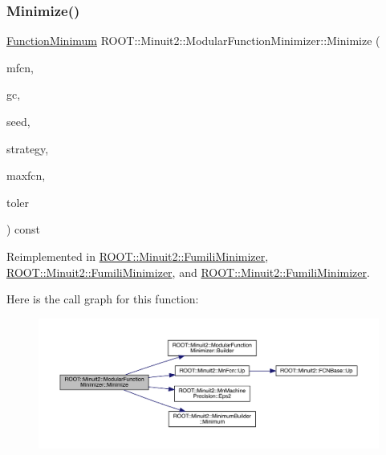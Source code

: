 \subsubsection{\texorpdfstring{Minimize()}{Minimize()}\hspace{0.1cm}{\footnotesize\ttfamily [31/33]}}
{\footnotesize\ttfamily \mbox{\hyperlink{classROOT_1_1Minuit2_1_1FunctionMinimum}{Function\+Minimum}} R\+O\+O\+T\+::\+Minuit2\+::\+Modular\+Function\+Minimizer\+::\+Minimize (\begin{DoxyParamCaption}\item[{const \mbox{\hyperlink{classROOT_1_1Minuit2_1_1MnFcn}{Mn\+Fcn}} \&}]{mfcn,  }\item[{const \mbox{\hyperlink{classROOT_1_1Minuit2_1_1GradientCalculator}{Gradient\+Calculator}} \&}]{gc,  }\item[{const \mbox{\hyperlink{classROOT_1_1Minuit2_1_1MinimumSeed}{Minimum\+Seed}} \&}]{seed,  }\item[{const \mbox{\hyperlink{classROOT_1_1Minuit2_1_1MnStrategy}{Mn\+Strategy}} \&}]{strategy,  }\item[{unsigned int}]{maxfcn,  }\item[{double}]{toler }\end{DoxyParamCaption}) const\hspace{0.3cm}{\ttfamily [virtual]}}



Reimplemented in \mbox{\hyperlink{classROOT_1_1Minuit2_1_1FumiliMinimizer_ace396e586a17ad934f18b32c8ddd054a}{R\+O\+O\+T\+::\+Minuit2\+::\+Fumili\+Minimizer}}, \mbox{\hyperlink{classROOT_1_1Minuit2_1_1FumiliMinimizer_ace396e586a17ad934f18b32c8ddd054a}{R\+O\+O\+T\+::\+Minuit2\+::\+Fumili\+Minimizer}}, and \mbox{\hyperlink{classROOT_1_1Minuit2_1_1FumiliMinimizer_ace396e586a17ad934f18b32c8ddd054a}{R\+O\+O\+T\+::\+Minuit2\+::\+Fumili\+Minimizer}}.

Here is the call graph for this function\+:
\nopagebreak
\begin{figure}[H]
\begin{center}
\leavevmode
\includegraphics[width=350pt]{d3/dc8/classROOT_1_1Minuit2_1_1ModularFunctionMinimizer_ac2b4ce9fa735f5014f610fd0374c58e4_cgraph}
\end{center}
\end{figure}
\mbox{\label{classROOT_1_1Minuit2_1_1ModularFunctionMinimizer_ad4852ac93fa43f2328b9857acc602296}} 
